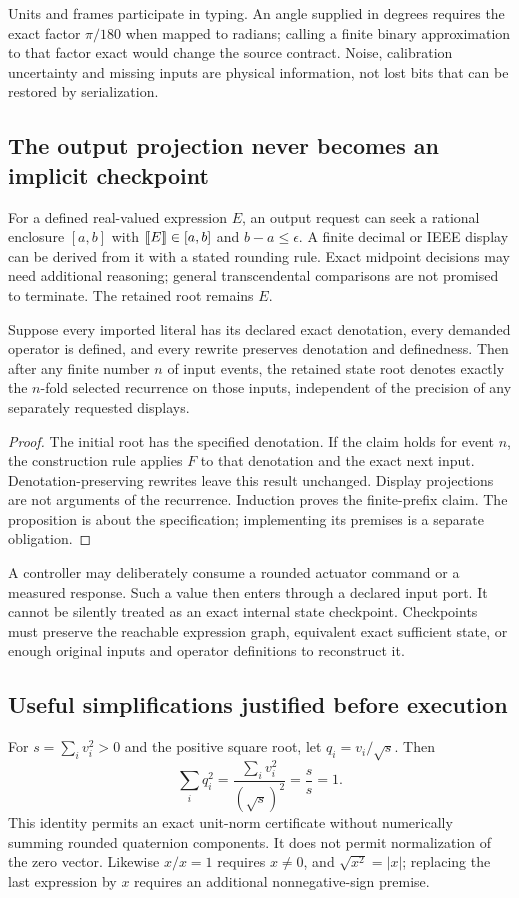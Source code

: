 Units and frames participate in typing. An angle supplied in degrees requires
the exact factor $\pi/180$ when mapped to radians; calling a finite binary
approximation to that factor exact would change the source contract. Noise,
calibration uncertainty and missing inputs are physical information, not lost
bits that can be restored by serialization.

\subsection{The output projection never becomes an implicit checkpoint}
For a defined real-valued expression $E$, an output request can seek a rational
enclosure $[a,b]$ with $\llbracket E\rrbracket\in[a,b]$ and $b-a\le\epsilon$. A finite decimal
or IEEE display can be derived from it with a stated rounding rule. Exact
midpoint decisions may need additional reasoning; general transcendental
comparisons are not promised to terminate. The retained root remains $E$.

\begin{proposition}
Suppose every imported literal has its declared exact denotation, every demanded
operator is defined, and every rewrite preserves denotation and definedness.
Then after any finite number $n$ of input events, the retained state root denotes
exactly the $n$-fold selected recurrence on those inputs, independent of the
precision of any separately requested displays.
\end{proposition}
\begin{proof}
The initial root has the specified denotation. If the claim holds for event $n$,
the construction rule applies $F$ to that denotation and the exact next input.
Denotation-preserving rewrites leave this result unchanged. Display projections
are not arguments of the recurrence. Induction proves the finite-prefix claim.
The proposition is about the specification; implementing its premises is a
separate obligation.
\end{proof}

A controller may deliberately consume a rounded actuator command or a measured
response. Such a value then enters through a declared input port. It cannot be
silently treated as an exact internal state checkpoint. Checkpoints must preserve
the reachable expression graph, equivalent exact sufficient state, or enough
original inputs and operator definitions to reconstruct it.

\subsection{Useful simplifications justified before execution}
For $s=\sum_i v_i^2>0$ and the positive square root, let $q_i=v_i/\sqrt{s}$.
Then
\[
 \sum_iq_i^2=\frac{\sum_i v_i^2}{(\sqrt{s})^2}=\frac{s}{s}=1.
\]
This identity permits an exact unit-norm certificate without numerically summing
rounded quaternion components. It does not permit normalization of the zero
vector. Likewise $x/x=1$ requires $x\ne0$, and $\sqrt{x^2}=|x|$; replacing the
last expression by $x$ requires an additional nonnegative-sign premise.

